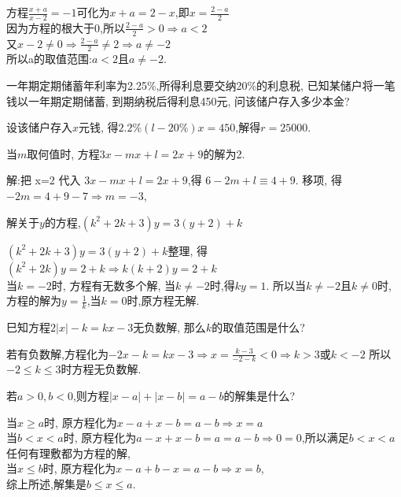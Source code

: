 \documentclass[cn,blue,12pt]{elegantbook}
\begin{document}
\begin{liti}[resume]
\begin{solution}
        方程\(\frac{x+a}{x-2}=-1\)可化为\(x+a=2-x\),即\(x=\frac{2-a}{2}\)\\
        因为方程的根大于0,所以\(\frac{2-a}{2}>0 \Rightarrow a<2\)\\
        又\(x-2 \ne 0 \Rightarrow \frac{2-a}{2}\ne 2 \Rightarrow a\ne -2\)\\
        所以a的取值范围:\(a<2\)且\(a \ne -2\).
\end{solution}
\item 一年期定期储蓄年利率为2.25\%,所得利息要交纳20\%的利息税, 已知某储户将一笔钱以一年期定期储蓄, 到期纳税后得利息450元, 问该储户存入多少本金?
\begin{solution}
        设该储户存入\(x\)元钱, 得\(2.2\%(l-20\%)x=450\),解得\(r=25 000\).
\end{solution}
\item 当\(m\)取何值时, 方程\(3x-mx+l= 2x + 9\)的解为2.
\begin{solution}
        解:把 x=2 代入 \(3x-mx+l=2x + 9\),得 \(6-2m+l≡4 + 9\).  移项, 得\(-2m=4+9-7 \Rightarrow m=-3\),
\end{solution}
\item 解关于\(y\)的方程,\((k^2+2k+3)y=3(y+2)+k\)
\begin{solution}
        \((k^2+2k+3)y=3(y+2)+k\)整理, 得\((k^2+2k)y=2+k \Rightarrow k(k+2)y=2+k\)\\
        当\(k=-2\)时, 方程有无数多个解, 当\(k \ne -2\)时,得\(ky=1\).
        所以当\(k\ne -2\)且\(k \ne 0\)时, 方程的解为\(y=\frac{1}{k}\),当\(k=0\)时,原方程无解.
\end{solution}
\item 巳知方程\(2|x|-k= kx-3\)无负数解, 那么\(k\)的取值范围是什么?
\begin{solution}
        若有负数解,方程化为\(-2x-k=kx-3 \Rightarrow x=\frac{k-3}{-2-k}<0 \Rightarrow k>3\text{或}k<-2\)
        所以\(-2\le k\le 3\)时方程无负数解.
\end{solution}
\item 若\(a>0,b<0\),则方程\(|x-a| + |x-b| =a-b\)的解集是什么?
\begin{solution}
        当\(x\ge a\)时, 原方程化为\(x-a+x-b=a-b \Rightarrow x=a\)\\
        当\(b<x<a\)时, 原方程化为\(a-x+x-b=a=a-b \Rightarrow 0=0\),所以满足\(b<x<a\)任何有理敷都为方程的解,\\
        当\(x\le b\)时, 原方程化为\(x-a+b-x=a-b \Rightarrow x=b\),\\
        综上所述,解集是\(b\le x\le a\).

\end{solution}
\end{liti}
\end{document}
